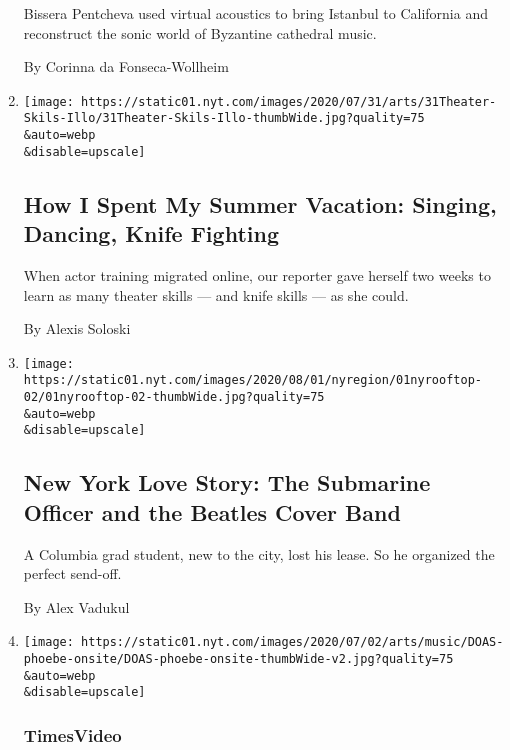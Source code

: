 \begin{enumerate}
  Bissera Pentcheva used virtual acoustics to bring Istanbul to
  California and reconstruct the sonic world of Byzantine cathedral
  music.

  By Corinna da Fonseca-Wollheim
\item
  \href{/2020/07/30/theater/theater-classes-at-home.html}{}

  \texttt{[image: https://static01.nyt.com/images/2020/07/31/arts/31Theater-Skils-Illo/31Theater-Skils-Illo-thumbWide.jpg?quality=75\\\&auto=webp\\\&disable=upscale]}

  \hypertarget{how-i-spent-my-summer-vacation-singing-dancing-knife-fighting}{%
  \subsection{How I Spent My Summer Vacation: Singing, Dancing, Knife
  Fighting}\label{how-i-spent-my-summer-vacation-singing-dancing-knife-fighting}}

  When actor training migrated online, our reporter gave herself two
  weeks to learn as many theater skills --- and knife skills --- as she
  could.

  By Alexis Soloski
\item
  \href{/2020/07/30/nyregion/coronavirus-beatles-nyc.html}{}

  \texttt{[image: https://static01.nyt.com/images/2020/08/01/nyregion/01nyrooftop-02/01nyrooftop-02-thumbWide.jpg?quality=75\\\&auto=webp\\\&disable=upscale]}

  \hypertarget{new-york-love-story-the-submarine-officer-and-the-beatles-cover-band}{%
  \subsection{New York Love Story: The Submarine Officer and the Beatles
  Cover
  Band}\label{new-york-love-story-the-submarine-officer-and-the-beatles-cover-band}}

  A Columbia grad student, new to the city, lost his lease. So he
  organized the perfect send-off.

  By Alex Vadukul
\item
  \href{/video/arts/music/100000007258359/phoebe-bridgers-kyoto.html}{}

  \texttt{[image: https://static01.nyt.com/images/2020/07/02/arts/music/DOAS-phoebe-onsite/DOAS-phoebe-onsite-thumbWide-v2.jpg?quality=75\\\&auto=webp\\\&disable=upscale]}

  \hypertarget{timesvideo}{%
  \subsubsection{TimesVideo}\label{timesvideo}}


\end{enumerate}
